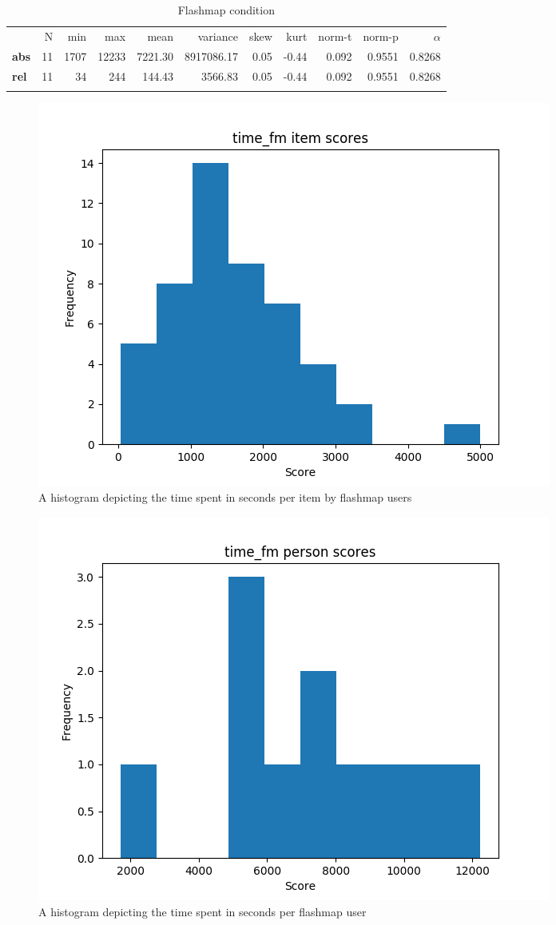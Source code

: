 \begin{longtable}[c]{@{}lrrrrrrrrrr@{}}
\caption{Flashmap condition}
\endfirsthead
\toprule\addlinespace
& N & min & max & mean & variance & skew & kurt & norm-t &
norm-p & $\alpha$
\\\addlinespace
\midrule
\textbf{abs} & 11 & 1707 & 12233 & 7221.30 & 8917086.17 & 0.05 & -0.44 &
0.092 & 0.9551 & 0.8268
\\\addlinespace
\textbf{rel} & 11 & 34 & 244 & 144.43 & 3566.83 & 0.05 & -0.44 & 0.092 &
0.9551 & 0.8268
\\\addlinespace
\bottomrule
    \label{tab:time_fm}
\end{longtable}

\begin{figure}
    \includegraphics[width=\textwidth]{img/time_fm_diff.png}
    \caption{A histogram depicting the time spent in seconds per item by flashmap users} 
    \label{fig:time_fm_diff}
\end{figure}
\begin{figure}
    \includegraphics[width=\textwidth]{img/time_fm_abil.png}
    \caption{A histogram depicting the time spent in seconds per flashmap user}
    \label{fig:time_fm_abil}
\end{figure}

